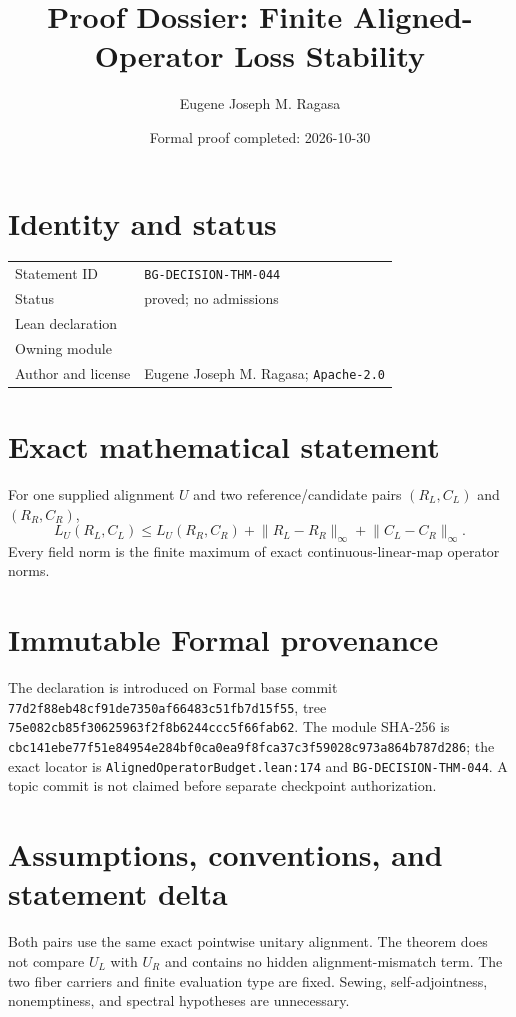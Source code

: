 \documentclass[11pt]{article}
\title{Proof Dossier: Finite Aligned-Operator Loss Stability}
\author{Eugene Joseph M. Ragasa}
\date{Formal proof completed: 2026-10-30}
\begin{document}
\raggedright
\maketitle

\section{Identity and status}
\begin{tabularx}{\textwidth}{@{}lY@{}}
\toprule
Statement ID & \texttt{BG-DECISION-THM-044} \\
Status & proved; no admissions \\
Lean declaration &  \\
Owning module &  \\
Author and license & Eugene Joseph M. Ragasa; \texttt{Apache-2.0} \\
\bottomrule
\end{tabularx}

\section{Exact mathematical statement}
For one supplied alignment $U$ and two reference/candidate pairs $(R_L,C_L)$ and $(R_R,C_R)$,
\[
 L_U(R_L,C_L)\leq L_U(R_R,C_R)
 +\lVert R_L-R_R\rVert_\infty+\lVert C_L-C_R\rVert_\infty.
\]
Every field norm is the finite maximum of exact continuous-linear-map operator norms.

\section{Immutable Formal provenance}
The declaration is introduced on Formal base commit
\texttt{77d2f88eb48cf91de7350af66483c51fb7d15f55}, tree
\texttt{75e082cb85f30625963f2f8b6244ccc5f66fab62}.  The module SHA-256 is
\texttt{cbc141ebe77f51e84954e284bf0ca0ea9f8fca37c3f59028c973a864b787d286}; the exact locator is \texttt{AlignedOperatorBudget.lean:174} and \texttt{BG-DECISION-THM-044}.  A topic commit is not claimed before separate checkpoint authorization.

\section{Assumptions, conventions, and statement delta}
Both pairs use the same exact pointwise unitary alignment.  The theorem does not compare $U_L$ with $U_R$ and contains no hidden alignment-mismatch term.  The two fiber carriers and finite evaluation type are fixed.  Sewing, self-adjointness, nonemptiness, and spectral hypotheses are unnecessary.
\end{document}
